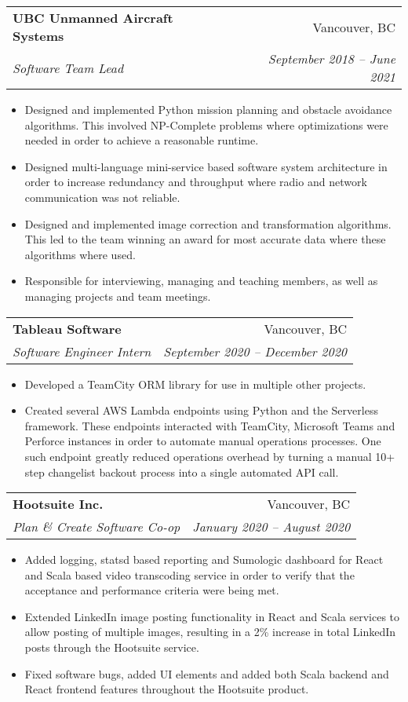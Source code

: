 \documentclass[letterpaper,11pt]{article}
\makeatletter
\newcommand{\resumeItem}[2]{
  \item\small{
    \textbf{#1}{#2 \vspace{-2pt}}
  }
}
\newcommand{\resumeSubheading}[4]{
  \vspace{-1pt}\item
    \begin{tabular*}{0.97\textwidth}[t]{l@{\extracolsep{\fill}}r}
      \textbf{#1} & #2 \\
      \textit{\small#3} & \textit{\small #4} \\
    \end{tabular*}\vspace{-5pt}
}
\newcommand{\resumeItemListStart}{\begin{itemize}}
\newcommand{\resumeItemListEnd}{\end{itemize}\vspace{-5pt}}
\makeatother
\begin{document}
	\resumeSubheading
      {UBC Unmanned Aircraft Systems}{Vancouver, BC}
      {Software Team Lead}{September 2018 -- June 2021}
      \resumeItemListStart
        \resumeItem{} {Designed and implemented Python mission planning and obstacle avoidance algorithms. This involved NP-Complete problems where optimizations were needed in order to achieve a reasonable runtime.}
        \resumeItem{} {Designed multi-language mini-service based software system architecture in order to increase redundancy and throughput where radio and network communication was not reliable.} 
        \resumeItem{} {Designed and implemented image correction and transformation algorithms. This led to the team winning an award for most accurate data where these algorithms where used.}   
        \resumeItem{} {Responsible for interviewing, managing and teaching members, as well as managing projects and team meetings.}
      \resumeItemListEnd


    \resumeSubheading
      {Tableau Software}{Vancouver, BC}
      {Software Engineer Intern }{September 2020 -- December 2020}
      \resumeItemListStart
        \resumeItem{} {Developed a TeamCity ORM library for use in multiple other projects.}
        \resumeItem{} {Created several AWS Lambda endpoints using Python and the Serverless framework. These endpoints interacted with TeamCity, Microsoft Teams and Perforce instances in order to automate manual operations processes. One such endpoint greatly reduced operations overhead by turning a manual 10+ step changelist backout process into a single automated API call.}
    \resumeItemListEnd


    \resumeSubheading
      {Hootsuite Inc.}{Vancouver, BC}
      {Plan \& Create Software Co-op}{January 2020 -- August 2020}
      \resumeItemListStart
        \resumeItem{} {Added logging, statsd based reporting and Sumologic dashboard for React and Scala based video transcoding service in order to verify that the acceptance and performance criteria were being met.}
        \resumeItem{} {Extended LinkedIn image posting functionality in React and Scala services to allow posting of multiple images, resulting in a 2\% increase in total LinkedIn posts through the Hootsuite service.}
        \resumeItem{} {Fixed software bugs, added UI elements and added both Scala backend and React frontend features throughout the Hootsuite product.}
      \resumeItemListEnd
\end{document}
